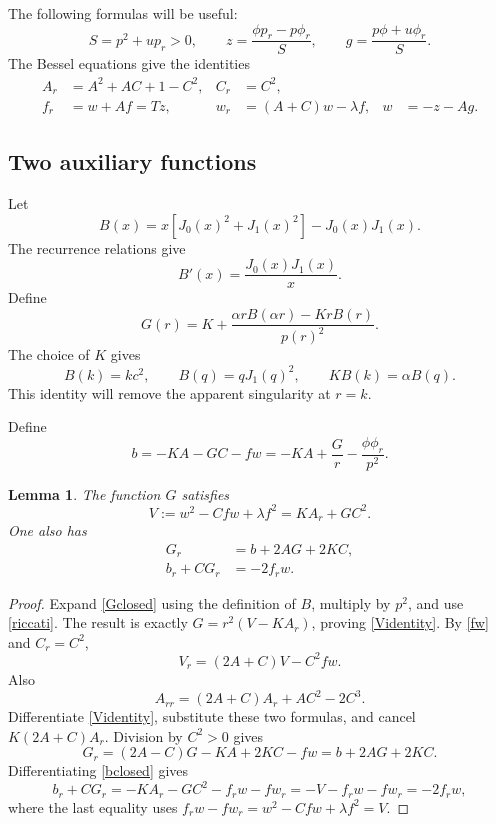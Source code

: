 \documentclass[11pt,letterpaper,reqno]{amsart}
\newtheorem{lemma}[theorem]{Lemma}
\theoremstyle{definition}
\begin{document}
The following formulas will be useful:
\begin{equation}
 S=p^2+up_r>0,\qquad
 z=\frac{\phi p_r-p\phi_r}{S},\qquad
 g=\frac{p\phi+u\phi_r}{S}.
\end{equation}
The Bessel equations give the identities
\begin{align}
 A_r&=A^2+AC+1-C^2,& C_r&=C^2,\label{riccati}\\
 f_r&=w+Af=Tz,&w_r&=(A+C)w-\lambda f,
 &w&=-z-Ag.\label{fw}
\end{align}

\subsection{Two auxiliary functions}
Let
\[
 B(x)=x[J_0(x)^2+J_1(x)^2]-J_0(x)J_1(x).
\]
The recurrence relations give
\[
 B'(x)=\frac{J_0(x)J_1(x)}x.
\]
Define
\begin{equation}\label{Gclosed}
 G(r)=K+\frac{\alpha rB(\alpha r)-KrB(r)}{p(r)^2}.
\end{equation}
The choice of $K$ gives
\[
 B(k)=kc^2,\qquad B(q)=qJ_1(q)^2,\qquad KB(k)=\alpha B(q).
\]
This identity will remove the apparent singularity at $r=k$.

Define
\begin{equation}\label{bclosed}
 b=-KA-GC-fw=-KA+\frac Gr-\frac{\phi\phi_r}{p^2}.
\end{equation}
\begin{lemma}
The function $G$ satisfies
\begin{equation}\label{Videntity}
 V:=w^2-Cfw+\lambda f^2=K A_r+GC^2.
\end{equation}
One also has
\begin{align}
 G_r&=b+2AG+2KC,\label{Gode}\\
 b_r+CG_r&=-2f_rw.\label{bidentity}
\end{align}
\end{lemma}
\begin{proof}
Expand \eqref{Gclosed} using the definition of $B$, multiply by $p^2$,
and use \eqref{riccati}. The result is exactly
$G=r^2(V-KA_r)$, proving \eqref{Videntity}.
By \eqref{fw} and $C_r=C^2$,
\[
 V_r=(2A+C)V-C^2fw.
\]
Also
\[
 A_{rr}=(2A+C)A_r+AC^2-2C^3.
\]
Differentiate \eqref{Videntity}, substitute these two formulas, and
cancel $K(2A+C)A_r$. Division by $C^2>0$ gives
\[
 G_r=(2A-C)G-KA+2KC-fw=b+2AG+2KC.
\]
Differentiating \eqref{bclosed} gives
\[
 b_r+CG_r=-KA_r-GC^2-f_rw-fw_r
         =-V-f_rw-fw_r=-2f_rw,
\]
where the last equality uses
$f_rw-fw_r=w^2-Cfw+\lambda f^2=V$.
\end{proof}
\end{document}
